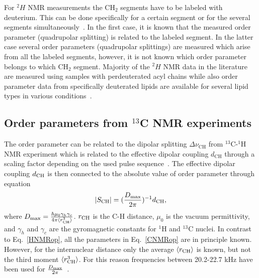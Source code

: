 \documentclass[aps,prl,superscriptaddress,twocolumn]{revtex4}
\begin{document}
For $^2H$ NMR measurements the CH$_2$ segments have to be labeled with deuterium.
This can be done specifically for a certain segment or for the several segments
simultaneously~\cite{davis83,bloom91,leftin11}. In the first case, it is known that the measured
order parameter (quadrupolar splitting) is related to the labeled segment.
In the latter case several order parameters (quadrupolar splittings) are
measured which arise from all the labeled segments, however, it is not known 
which order parameter belongs to which CH$_2$ segment. Majority of the $^2H$ NMR data
in the literature are measured using samples with perdeuterated acyl chains \cite{leftin11,marsh13}
while also order parameter data from specifically deuterated lipids are available for 
several lipid types in various conditions~\cite{seelig74,seelig75,seelig77,seelig78,gally81,akutsu81,altenbach84,scherer89,kuchinka89,roux90,ulrich94,douliez95}.

\subsection{Order parameters from $^{13}$C NMR experiments}\label{CopSECTION}

The order parameter can be related to the dipolar splitting $\Delta \nu_\mathrm{CH}$ 
from $^{13}$C-$^1$H NMR experiment which is related to the effective dipolar 
coupling $d_\mathrm{CH}$ through a scaling factor depending on the used pulse 
sequence~\cite{hong95a,gross97,dvinskikh05a,ferreira13}. The effective dipolar 
coupling $d_{{\rm CH}}$ is then connected to the absolute value of order parameter through equation
\begin{equation}\label{CNMRop}
|S_{{\rm CH}}|=(\frac{D_{{\rm max}}}{2\pi})^{-1}d_\mathrm{CH},
\end{equation}
where $D_{{\rm max}} = \frac{\hbar \mu_0 \gamma_h \gamma_c}{4\pi\langle r_\mathrm{CH}^3 \rangle}$. 
$r_{{\rm CH}}$ is the C-H distance, $\mu_0$ is the vacuum permittivity, and $\gamma_h$ and $\gamma_c$ are 
the gyromagnetic constants for $^1$H and $^{13}$C nuclei. In contrast to Eq.~\ref{HNMRop}, all the parameters in 
Eq.~\ref{CNMRop} are in principle known. However, for the internuclear distance only the average $\langle r_{{\rm CH}} \rangle$ 
is known, but not the third moment $\langle r^3_{{\rm CH}} \rangle$. For this reason frequencies between 20.2-22.7 kHz have been used for
$\frac{D_{{\rm max}}}{2\pi}$~\cite{hong95a,gross97,dvinskikh05a,becker05,ferreira13,ferreira15}.
\end{document}
